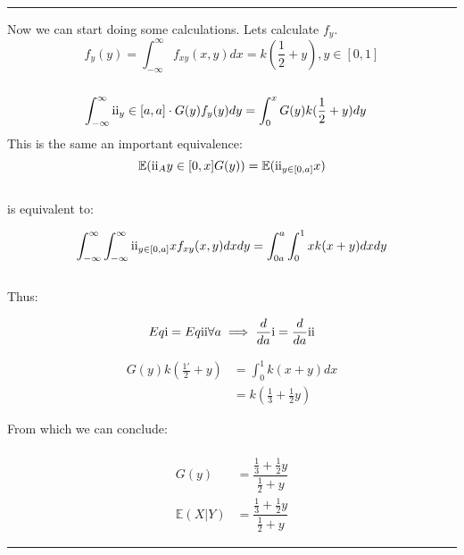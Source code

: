 \documentclass{article}
\newcommand{\RN}[1]{%
  \textup{\uppercase\expandafter{\romannumeral#1}}%
}
\begin{document}
\noindent\rule{15cm}{0.4pt}%

Now we can start doing some calculations. Lets calculate $f_{y}$.             \\
$$f_{y}(y) = \int_{-\infty}^{\infty} f_{xy}(x,y) dx =  
 k(\frac{1}{2} + y), y \in [0,1]$$                                            \\
\begin{equation*}
  \begin{split}
    \int_{-\infty}^{\infty} \RN{2}_{y} \in [a,a] \cdot G(y)f_{y}(y)dy 
     &= \int_{0}^{x} G(y) k(\frac{1}{2} +y) dy
  \end{split}
\end{equation*}
This is the same an important equivalence:
$$ \mathbb{E}(\RN{2}_{A}y\in[0,x] G(y)) 
= \mathbb{E}(\RN{2}_{y\in[0,a]}x)$$                                \\

is equivalent to:

$$\int_{-\infty}^{\infty}\int_{-\infty}^{\infty} \RN{2}_{y\in [0,a]} xf_{xy}(x,y)dxdy 
= \int_{0a}^{a}\int_{0}^{1} xk(x+y) dxdy$$\\

Thus:

$$Eq\RN{1} = Eq\RN{2} \forall a \implies \frac{d}{da}\RN{1} = \frac{d}{da}\RN{2}$$

\begin{equation*}
  \begin{split}
    G(y) k(\frac{1'}{2} + y) &= \int_{0}^{1} k(x+y) dx                        \\
                             &= k(\frac{1}{3} + \frac{1}{2}y)
  \end{split}
\end{equation*}

From which we can conclude:                                                   \\
\\
\begin{equation*}
  \begin{split}
G(y) &= \dfrac{\frac{1}{3} + \frac{1}{2}y}{\frac{1}{2} + y}                   \\
\mathbb{E}(X|Y)     &= \dfrac{\frac{1}{3} + \frac{1}{2}y}{\frac{1}{2} + y}
  \end{split}
\end{equation*}



\noindent\rule{15cm}{0.4pt}%
\end{document}
